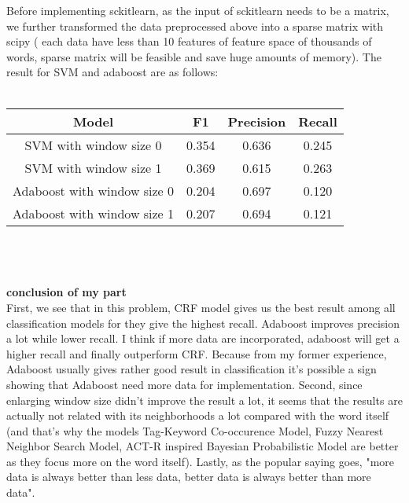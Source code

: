 \documentclass[paper=a4, fontsize=11pt]{scrartcl} %
\numberwithin{equation}{section} %
\numberwithin{figure}{section} %
\numberwithin{table}{section} %
\begin{document}
Before implementing sckitlearn,  as the input of sckitlearn needs to be a matrix, we further transformed the data preprocessed above into a sparse matrix with scipy ( each data have less than 10 features of feature space of thousands of words, sparse matrix will be feasible and save huge amounts of memory). The result for SVM and adaboost are as follows: \\
\ \\
\begin{tabular}{|c|c|c|c|}
\hline
Model & F1 & Precision & Recall \\
\hline
SVM with window size 0 & 0.354 & 0.636 & 0.245 \\
\hline
SVM with window size 1 & 0.369 & 0.615 & 0.263 \\
\hline
Adaboost with window size 0 & 0.204 & 0.697 & 0.120 \\
\hline
Adaboost with window size 1 & 0.207 & 0.694 & 0.121 \\
\hline 
\end{tabular}
\ \\
\ \\
\ \\
{\bf conclusion of my part}\\
First, we see that in this problem, CRF model gives us the best result among all classification models for they give the highest recall. Adaboost improves precision a lot while lower recall. I think if more data are incorporated, adaboost will get a higher recall and finally outperform CRF. Because from my former experience, Adaboost usually gives rather good result in classification it's possible a sign showing that Adaboost need more data for implementation. Second, since enlarging window size didn't improve the result a lot, it seems that the results are actually not related with its neighborhoods a lot compared  with the word itself (and that's why the models Tag-Keyword Co-occurence Model, Fuzzy Nearest Neighbor Search Model, ACT-R inspired Bayesian Probabilistic Model are better as they focus more on the word itself). Lastly, as the popular saying goes, "more data is always better than less data, better data is always better than more data".
\end{document}
